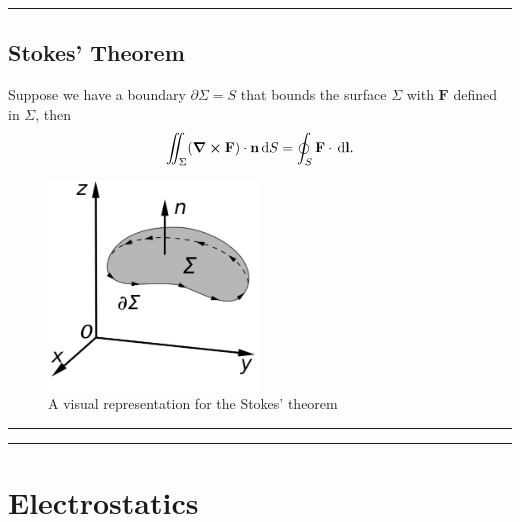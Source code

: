 \documentclass[a4paper]{article}
\newcommand{\dmr}[1]{\, \mathrm{d}#1} %
\numberwithin{equation}{subsection}
\renewcommand{\vec}[1]{\mathbf{#1}}
\begin{document}
\par\noindent\rule{\textwidth}{0.4pt}

\subsection{Stokes' Theorem}
Suppose we have a boundary $\partial \Sigma = S$ that bounds the surface $\Sigma$ with $\vec{F}$ defined in $\Sigma$, then
\[
    \iint_{\Sigma} (\grad \cross \vec{F})\cdot\vec{n}\dmr{S} = \oint_{S} \vec{F}\cdot \dmr{\vec{l}}.
\] 
\begin{figure}[h]
    \centering
    \includegraphics[width =0.5\textwidth]{1200px-Stokes'_Theorem.svg.png}
    \caption{A visual representation for the Stokes' theorem\cite{noauthor_stokes_2021}}
\end{figure}

\par\noindent\rule{\textwidth}{0.4pt}
\par\noindent\rule{\textwidth}{0.4pt}
\section{Electrostatics}
\end{document}
